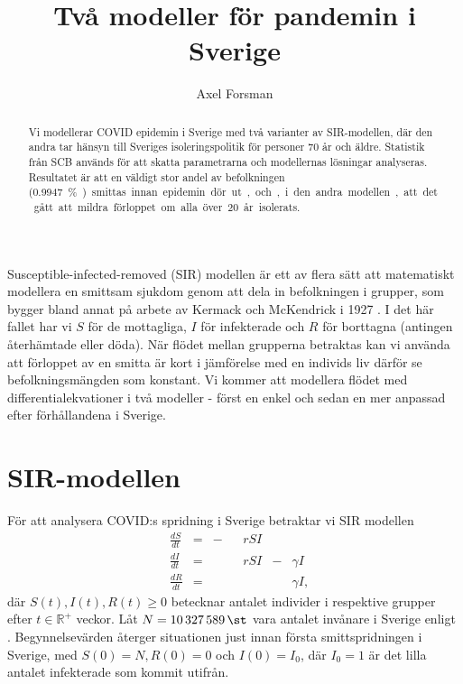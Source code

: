 \documentclass{article}
\title{Två modeller för \covid{} pandemin i Sverige}
\author{Axel Forsman}
\newcommand\covid{COVID\nobreakdash-19}
\begin{document}
\maketitle

\begin{abstract}
	Vi modellerar \covid{} epidemin i Sverige med två varianter av SIR-modellen,
	där den andra tar hänsyn till
	Sveriges isoleringspolitik för personer 70 år och äldre.
	Statistik från SCB används för att skatta parametrarna
	och modellernas lösningar analyseras.
	Resultatet är att en väldigt stor andel av befolkningen
	(\SI{0.9947}\percent) smittas innan epidemin dör ut, och,
	i den andra modellen, att det gått att mildra förloppet
	om alla över 20 år isolerats.
\end{abstract}

Susceptible-infected-removed (SIR) modellen är ett av flera sätt
att matematiskt modellera en smittsam sjukdom
genom att dela in befolkningen i grupper,
som bygger bland annat på arbete av Kermack och McKendrick i 1927 \autocite{kermack27}.
I det här fallet har vi $S$ för de mottagliga, $I$ för infekterade
och $R$ för borttagna (antingen återhämtade eller döda).
När flödet mellan grupperna betraktas kan vi använda att
förloppet av en smitta är kort i jämförelse med en individs liv
därför se befolkningsmängden som konstant.
Vi kommer att modellera flödet med differentialekvationer i två modeller -
först en enkel och sedan en mer anpassad efter förhållandena i Sverige.

\section{SIR-modellen}

För att analysera \covid:s spridning i Sverige betraktar vi SIR modellen
\begin{equation}\label{eq:sir}
	\begin{alignedat}{4}
		& \frac{dS}{dt} &=& -&&rSI && \\
		& \frac{dI}{dt} &=& &&rSI &-& \gamma I \\
		& \frac{dR}{dt} &=& && &&\gamma I,
	\end{alignedat}
\end{equation}
där $S(t), I(t), R(t) \ge 0$ betecknar antalet individer i respektive grupper
efter $t \in \mathbb R^+$ veckor.
\def\N{10327589}
Låt $N = \SI{10327589}\st$ vara antalet invånare i Sverige
enligt \autocite{population}.
Begynnelsevärden återger situationen just innan
första smittspridningen i Sverige,
med $S(0) = N, R(0) = 0$ och $I(0) = I_0$,
där $I_0 = 1$ är det lilla antalet infekterade som kommit utifrån.
\end{document}
